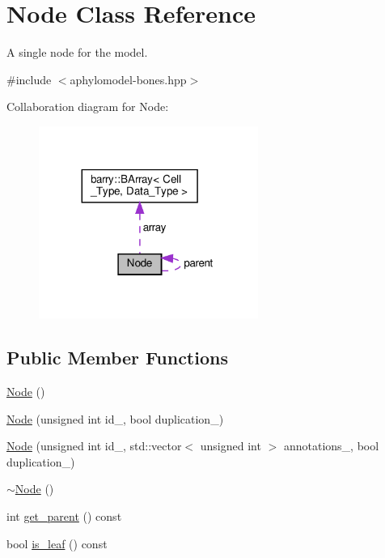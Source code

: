 \hypertarget{class_node}{}\section{Node Class Reference}
\label{class_node}


A single node for the model.  




{\ttfamily \#include $<$aphylomodel-\/bones.\+hpp$>$}



Collaboration diagram for Node\+:
\nopagebreak
\begin{figure}[H]
\begin{center}
\leavevmode
\includegraphics[width=203pt]{class_node__coll__graph}
\end{center}
\end{figure}
\subsection*{Public Member Functions}
\begin{DoxyCompactItemize}
\item 
\hyperlink{class_node_ad7a34779cad45d997bfd6d3d8043c75f}{Node} ()
\item 
\hyperlink{class_node_affbe0c59bdcfd5e8068d50b49742cff6}{Node} (unsigned int id\+\_\+, bool duplication\+\_\+)
\item 
\hyperlink{class_node_a05edab5d06fba5a71443399343645553}{Node} (unsigned int id\+\_\+, std\+::vector$<$ unsigned int $>$ annotations\+\_\+, bool duplication\+\_\+)
\item 
\hyperlink{class_node_aa0840c3cb5c7159be6d992adecd2097c}{$\sim$\+Node} ()
\item 
int \hyperlink{class_node_a661cb63a33e950b84c9c093c63d1ab63}{get\+\_\+parent} () const
\item 
bool \hyperlink{class_node_af7cc2d0f435e3bee4388a0e9ab42adb8}{is\+\_\+leaf} () const
\end{DoxyCompactItemize}
